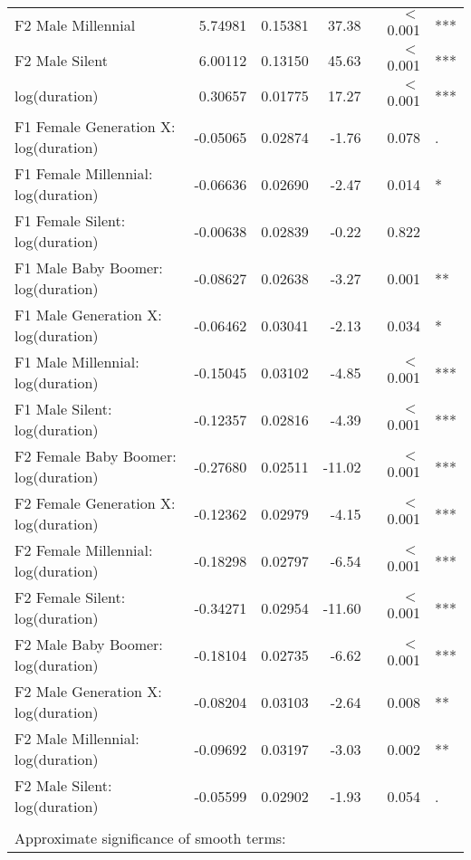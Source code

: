 \begin{table}[ht]
{{\begin{tabular}{l r r r r@{\hskip1pt} @{\hskip0pt}l}
{}F2 Male Millennial           &  5.74981  &  0.15381 &  37.38 &        $<$ 0.001 & *** \\
{}F2 Male Silent               &  6.00112  &  0.13150 &  45.63 &        $<$ 0.001 & *** \\
log(duration)                                        &  0.30657  &  0.01775 &  17.27 &        $<$ 0.001 & *** \\
{}F1 Female Generation X: log(duration)        & -0.05065  &  0.02874 &  -1.76 &            0.078 & .   \\
{}F1 Female Millennial: log(duration)  & -0.06636  &  0.02690 &  -2.47 &            0.014 & *   \\
{}F1 Female Silent: log(duration)      & -0.00638  &  0.02839 &  -0.22 &            0.822 &     \\
{}F1 Male Baby Boomer: log(duration)      & -0.08627  &  0.02638 &  -3.27 &            0.001 & **  \\
{}F1 Male Generation X: log(duration)        & -0.06462  &  0.03041 &  -2.13 &            0.034 & *   \\
{}F1 Male Millennial: log(duration)  & -0.15045  &  0.03102 &  -4.85 &        $<$ 0.001 & *** \\
{}F1 Male Silent: log(duration)      & -0.12357  &  0.02816 &  -4.39 &        $<$ 0.001 & *** \\
{}F2 Female Baby Boomer: log(duration)      & -0.27680  &  0.02511 & -11.02 &        $<$ 0.001 & *** \\
{}F2 Female Generation X: log(duration)        & -0.12362  &  0.02979 &  -4.15 &        $<$ 0.001 & *** \\
{}F2 Female Millennial: log(duration)  & -0.18298  &  0.02797 &  -6.54 &        $<$ 0.001 & *** \\
{}F2 Female Silent: log(duration)      & -0.34271  &  0.02954 & -11.60 &        $<$ 0.001 & *** \\
{}F2 Male Baby Boomer: log(duration)      & -0.18104  &  0.02735 &  -6.62 &        $<$ 0.001 & *** \\
{}F2 Male Generation X: log(duration)        & -0.08204  &  0.03103 &  -2.64 &            0.008 & **  \\
{}F2 Male Millennial: log(duration)  & -0.09692  &  0.03197 &  -3.03 &            0.002 & **  \\
{}F2 Male Silent: log(duration)      & -0.05599  &  0.02902 &  -1.93 &            0.054 & .   \\
\\
\multicolumn{6}{l}{Approximate significance of smooth terms:}\\

\end{tabular}}}
\end{table}
